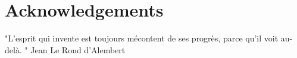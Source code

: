 \chapter*{Acknowledgements}
"L’esprit qui invente est toujours mécontent de ses progrès, parce qu’il voit au-delà. " Jean Le Rond d’Alembert
